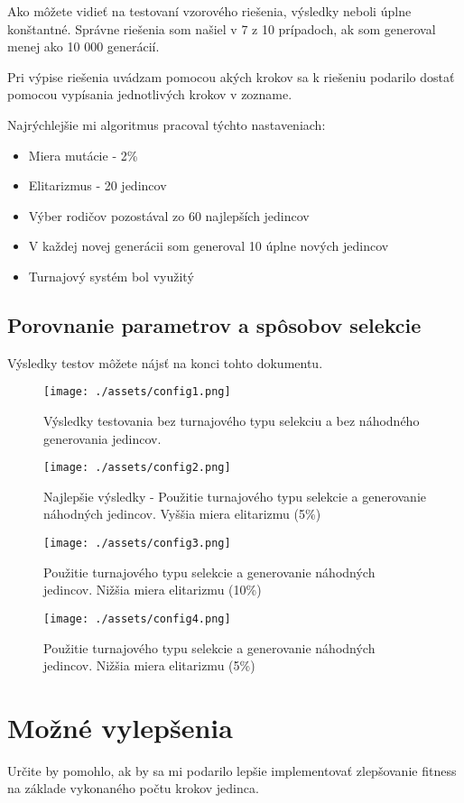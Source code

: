 \documentclass[10pt,oneside,slovak,a4paper]{article}
\begin{document}
\medskip

Ako môžete vidieť na testovaní vzorového riešenia, výsledky neboli úplne konštantné.
Správne riešenia som našiel v 7 z 10 prípadoch, ak som generoval menej ako 10 000 generácií.

\medskip 

Pri výpise riešenia uvádzam pomocou akých krokov sa k riešeniu podarilo dostať pomocou vypísania jednotlivých krokov v zozname.

Najrýchlejšie mi algoritmus pracoval týchto nastaveniach:

\begin{itemize}
\item{Miera mutácie - 2\%}
\item{Elitarizmus - 20 jedincov}
\item{Výber rodičov pozostával zo 60 najlepších jedincov}
\item{V každej novej generácii som generoval 10 úplne nových jedincov}
\item{Turnajový systém bol využitý}
\end{itemize}

\subsection{Porovnanie parametrov a spôsobov selekcie}

Výsledky testov môžete nájsť na konci tohto dokumentu.

\begin{figure}[h]
\centerline{\texttt{[image: ./assets/config1.png]}} 
\caption{Výsledky testovania bez turnajového typu selekciu a bez náhodného generovania jedincov.}
\end{figure}

\begin{figure}[h]
\centerline{\texttt{[image: ./assets/config2.png]}} 
\caption{Najlepšie výsledky - Použitie turnajového typu selekcie a generovanie náhodných jedincov. Vyššia miera elitarizmu (5\%) }
\end{figure}

\begin{figure}[h]
\centerline{\texttt{[image: ./assets/config3.png]}} 
\caption{Použitie turnajového typu selekcie a generovanie náhodných jedincov. Nižšia miera elitarizmu (10\%)}
\end{figure}

\begin{figure}[h]
\centerline{\texttt{[image: ./assets/config4.png]}} 
\caption{Použitie turnajového typu selekcie a generovanie náhodných jedincov. Nižšia miera elitarizmu (5\%) }
\end{figure}

\section{Možné vylepšenia}
Určite by pomohlo, ak by sa mi podarilo lepšie implementovať zlepšovanie fitness na základe vykonaného počtu krokov jedinca. 
\end{document}

